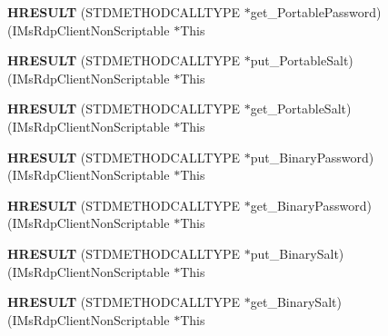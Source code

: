 \begin{DoxyCompactItemize}
\item 
\mbox{\label{struct_i_ms_rdp_client_non_scriptable_vtbl_a1a17c904b90f563d2fd7deb645f700dd}} 
{\bfseries H\+R\+E\+S\+U\+LT} (S\+T\+D\+M\+E\+T\+H\+O\+D\+C\+A\+L\+L\+T\+Y\+PE $\ast$get\+\_\+\+Portable\+Password)(I\+Ms\+Rdp\+Client\+Non\+Scriptable $\ast$This
\item 
\mbox{\label{struct_i_ms_rdp_client_non_scriptable_vtbl_a00be72b704708c86939191aac98c089e}} 
{\bfseries H\+R\+E\+S\+U\+LT} (S\+T\+D\+M\+E\+T\+H\+O\+D\+C\+A\+L\+L\+T\+Y\+PE $\ast$put\+\_\+\+Portable\+Salt)(I\+Ms\+Rdp\+Client\+Non\+Scriptable $\ast$This
\item 
\mbox{\label{struct_i_ms_rdp_client_non_scriptable_vtbl_a072130f03f6ffc2b4e37aca9f1cb635c}} 
{\bfseries H\+R\+E\+S\+U\+LT} (S\+T\+D\+M\+E\+T\+H\+O\+D\+C\+A\+L\+L\+T\+Y\+PE $\ast$get\+\_\+\+Portable\+Salt)(I\+Ms\+Rdp\+Client\+Non\+Scriptable $\ast$This
\item 
\mbox{\label{struct_i_ms_rdp_client_non_scriptable_vtbl_a3c831f112e17220426e5e20d9b151d37}} 
{\bfseries H\+R\+E\+S\+U\+LT} (S\+T\+D\+M\+E\+T\+H\+O\+D\+C\+A\+L\+L\+T\+Y\+PE $\ast$put\+\_\+\+Binary\+Password)(I\+Ms\+Rdp\+Client\+Non\+Scriptable $\ast$This
\item 
\mbox{\label{struct_i_ms_rdp_client_non_scriptable_vtbl_a897ae9dafa0ba3316f4d96f213af8e2d}} 
{\bfseries H\+R\+E\+S\+U\+LT} (S\+T\+D\+M\+E\+T\+H\+O\+D\+C\+A\+L\+L\+T\+Y\+PE $\ast$get\+\_\+\+Binary\+Password)(I\+Ms\+Rdp\+Client\+Non\+Scriptable $\ast$This
\item 
\mbox{\label{struct_i_ms_rdp_client_non_scriptable_vtbl_ab1c125fc6f8a78cab609cd248bce88d5}} 
{\bfseries H\+R\+E\+S\+U\+LT} (S\+T\+D\+M\+E\+T\+H\+O\+D\+C\+A\+L\+L\+T\+Y\+PE $\ast$put\+\_\+\+Binary\+Salt)(I\+Ms\+Rdp\+Client\+Non\+Scriptable $\ast$This
\item 
\mbox{\label{struct_i_ms_rdp_client_non_scriptable_vtbl_a8df72b1d09a711de676f19f286daebb1}} 
{\bfseries H\+R\+E\+S\+U\+LT} (S\+T\+D\+M\+E\+T\+H\+O\+D\+C\+A\+L\+L\+T\+Y\+PE $\ast$get\+\_\+\+Binary\+Salt)(I\+Ms\+Rdp\+Client\+Non\+Scriptable $\ast$This

\end{DoxyCompactItemize}
